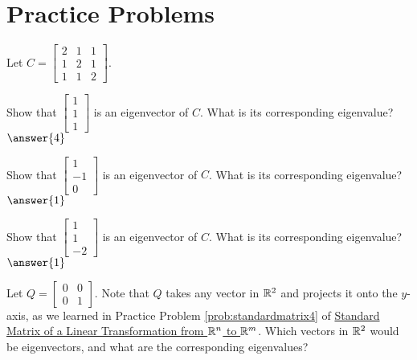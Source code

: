 \documentclass{ximera}
\begin{document}
\section*{Practice Problems}

\begin{problem}Let $C=\begin{bmatrix} 2 & 1 & 1\\ 1 & 2 & 1\\ 1 & 1 & 2\end{bmatrix}$.  \begin{problem}\label{prob:checkeig1}
Show that $\begin{bmatrix} 1\\1\\1 \end{bmatrix}$ is an eigenvector of $C$.  What is its corresponding eigenvalue?
$\answer{4}$
\end{problem}
 \begin{problem}\label{prob:checkeig2}
Show that $\begin{bmatrix} 1\\-1\\0 \end{bmatrix}$ is an eigenvector of $C$.  What is its corresponding eigenvalue?
$\answer{1}$
\end{problem}
 \begin{problem}\label{prob:checkeig3}
Show that $\begin{bmatrix} 1\\1\\-2 \end{bmatrix}$ is an eigenvector of $C$.  What is its corresponding eigenvalue?
$\answer{1}$
\end{problem}
\end{problem}



\begin{problem}\label{prob:eigprojmatrix} Let $Q=\begin{bmatrix} 0& 0\\ 0&1\end{bmatrix}$.  Note that $Q$ takes any vector in $\mathbb{R}^2$ and projects it onto the $y$-axis, as we learned in Practice Problem \ref{prob:standardmatrix4} of \href{https://ximera.osu.edu/oerlinalg/LinearAlgebra/LTR-0020/main}{Standard Matrix of a Linear Transformation from $\mathbb{R}^n$ to $\mathbb{R}^m$}.  Which vectors in $\mathbb{R}^2$ would be eigenvectors, and what are the corresponding eigenvalues?
\end{problem}
\end{document}
